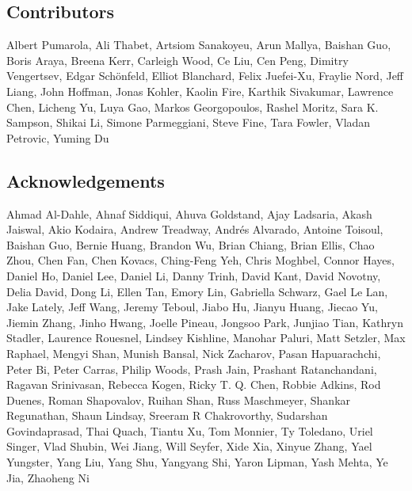 \documentclass[]{fairmeta}
\begin{document}
\subsection*{Contributors}
Albert Pumarola, Ali Thabet, Artsiom Sanakoyeu, Arun Mallya, Baishan Guo, Boris Araya, Breena Kerr, Carleigh Wood, Ce Liu, Cen Peng, Dimitry Vengertsev, Edgar Sch\"onfeld, Elliot Blanchard, Felix Juefei-Xu, Fraylie Nord, Jeff Liang, John Hoffman, Jonas Kohler, Kaolin Fire, Karthik Sivakumar, Lawrence Chen, Licheng Yu, Luya Gao, Markos Georgopoulos, Rashel Moritz, Sara K. Sampson, Shikai Li, Simone Parmeggiani, Steve Fine, Tara Fowler, Vladan Petrovic, Yuming Du

\subsection*{Acknowledgements}
Ahmad Al-Dahle, Ahnaf Siddiqui, Ahuva Goldstand, Ajay Ladsaria, Akash Jaiswal, Akio Kodaira, Andrew Treadway, Andrés Alvarado, Antoine Toisoul, Baishan Guo, Bernie Huang, Brandon Wu, Brian Chiang, Brian Ellis, Chao Zhou, Chen Fan, Chen Kovacs, Ching-Feng Yeh, Chris Moghbel, Connor Hayes, Daniel Ho, Daniel Lee, Daniel Li, Danny Trinh, David Kant, David Novotny, Delia David, Dong Li, Ellen Tan, Emory Lin, Gabriella Schwarz, Gael Le Lan, Jake Lately, Jeff Wang, Jeremy Teboul, Jiabo Hu, Jianyu Huang, Jiecao Yu, Jiemin Zhang, Jinho Hwang, Joelle Pineau, Jongsoo Park, Junjiao Tian, Kathryn Stadler, Laurence Rouesnel, Lindsey Kishline, Manohar Paluri, Matt Setzler, Max Raphael, Mengyi Shan, Munish Bansal, Nick Zacharov, Pasan Hapuarachchi, Peter Bi, Peter Carras, Philip Woods, Prash Jain, Prashant Ratanchandani, Ragavan Srinivasan, Rebecca Kogen, Ricky T. Q. Chen, Robbie Adkins, Rod Duenes, Roman Shapovalov, Ruihan Shan, Russ Maschmeyer, Shankar Regunathan, Shaun Lindsay, Sreeram R Chakrovorthy, Sudarshan Govindaprasad, Thai Quach, Tiantu Xu, Tom Monnier, Ty Toledano, Uriel Singer, Vlad Shubin, Wei Jiang, Will Seyfer, Xide Xia, Xinyue Zhang, Yael Yungster, Yang Liu, Yang Shu, Yangyang Shi, Yaron Lipman, Yash Mehta, Ye Jia, Zhaoheng Ni


{}



\newpage
\beginappendix
{}
{}
\renewcommand{\thesection}{\Alph{section}}
\renewcommand{\thesubsection}{\Alph{section}.\arabic{subsection}}





\end{document}
